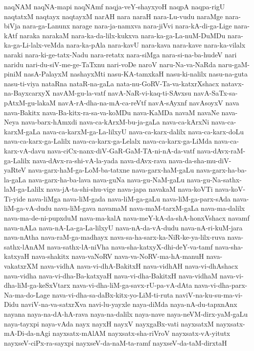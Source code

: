 {naqNAM
naqNA-mapi
naqNAmf
naqja-veY-shayxyoH
naqpA
naqpa-rigU
naqtatxM
naqtayx
naqtayxM
narAH
nara
naraH
nara-Lu-vudu
naraMge
nara-biVja
nara-ga-Lanunx
narage
nara-ja-namxva
nara-jiVvi
nara-kA-di-ga-Lige
nara-kAtf
naraka
narakaM
nara-ka-da-lilx-kukxva
nara-ka-ga-La-nuM-DuMDu
nara-ka-ga-Li-lalx-veMda
nara-ka-pAla
nara-kavU
nara-kava
nara-kave
nara-ka-vilalx
naraki
nara-ki-ge-tatx-Nadu
nara-retatx
nara-siMga
nara-si-na-ba-hudeV
nari
naridu
nari-du-siV-me-ge-TaTxnu
nari-voDe
naroV
naru-Na-va-NaRda
naru-gaM-piniM
nasA-PalayxM
nashayxMti
nasu-KA-tamxkaH
nasu-ki-nalilx
nasu-na-guta
nasu-ti-viya
nataRna
nataR-na-gaLa
nata-nu-GoRV-Ta-va-katxrXshacx
natavx-na-BayxcarxyX
navAM-gu-la-vatf
navA-NaR-vi-kaq-ti-SAvxsu
navA-SaTx-sa-pAtxM-gu-lakaM
navA-rA-dha-na-mA-ca-reVtf
navA-sAyxnf
navAsoyxV
nava
nava-Bakitx
nava-Ba-kitx-ra-sa-va-koMDu
nava-KaMDa
navaM
navaNe
nava-Neya
nava-barx-hAmxdi
nava-ca-kArxM-bu-ja-gaLa
nava-ca-kArxNi
nava-ca-karxM-gaLa
nava-ca-karxM-ga-La-lilxyU
nava-ca-karx-dalilx
nava-ca-karx-doLu
nava-ca-karx-ga-Lalilx
nava-ca-karx-ga-Lelalx
nava-ca-karx-ga-LiMda
nava-ca-karx-vA-davu
nava-ciCx-nanx-diV-GaR-GaM-TA-ni-nA-da-vatf
nava-dAvx-raM-ga-Lalilx
nava-dAvx-ra-shi-vA-la-yada
nava-dAvx-rava
nava-da-sha-mu-diV-yaRteV
nava-garx-haM-ga-LoM-ba-tatxne
nava-garx-haM-gaLu
nava-garx-ha-ba-la-gaLa
nava-garx-ha-ba-lava
nava-guNa
nava-gu-NaM-gaLu
nava-gu-Na-sathx-laM-ga-Lalilx
nava-jA-ta-shi-shu-vige
nava-japa
navakaM
nava-koVTi
nava-koV-Ti-yide
nava-liMga
nava-liM-gada
nava-liM-ga-gaLu
nava-liM-ga-parx-sAda
nava-liM-ga-vA-dudu
nava-liM-gava
navamaM
nava-maM-tarxM-gaLa
nava-ma-dalilx
nava-ma-de-ni-pupxduM
nava-ma-kalA
nava-meY-kA-da-shA-honxVshacx
navamf
nava-nALa
nava-nA-La-ga-La-lilxyU
nava-nA-da-vA-dudu
nava-nA-ri-kuM-jara
nava-nAtha
nava-raM-ga-madhayx
nava-sa-ha-sarx-ka-NiR-ke-ya-lilx-ruva
nava-sathx-lAnAM
nava-sathx-lA-niVha
nava-sha-katxyX-dhi-deY-va-tamf
nava-sha-katxyaH
nava-shakitx
nava-vaNoRV
nava-va-NoRV-ma-hA-manuH
nava-vakatxrXM
nava-vidhA
nava-vi-dhA-BakitxH
nava-vidhAH
nava-vi-dhAshacx
nava-vidha
nava-vi-dha-Ba-katxyaH
nava-vi-dha-BakitxH
nava-vidhaM
nava-vi-dha-liM-ga-keSxVtarx
nava-vi-dha-liM-ga-savx-rU-pa-vA-dAta
nava-vi-dha-parx-Na-ma-do-Lage
nava-vi-dha-sa-daBx-kitx-yo-LiM-ti-ruta
naviV-na-ku-su-ma-vi-Didu
naviV-na-va-satxrXva
navi-lu-yayxle
naya-diMda
naya-nA-du-tapxnAnx
nayana
naya-na-dA-hA-rava
naya-na-dalilx
naya-nave
naya-neVM-dirx-yaM-gaLu
naya-tayxpi
naya-vAda
nayx
nayxH
nayxV
nayxgaBx-vati
nayxsatxM
nayxsatx-mA-Di-da-nAgi
nayxsatx-mAlAM
nayxsatx-sha-riVroV
nayxsatx-vA-yitutx
nayxseV-ciPx-ra-sayxpi
nayxseV-da-naM-ta-ramf
nayxseV-da-taM-dirxtaH
}
